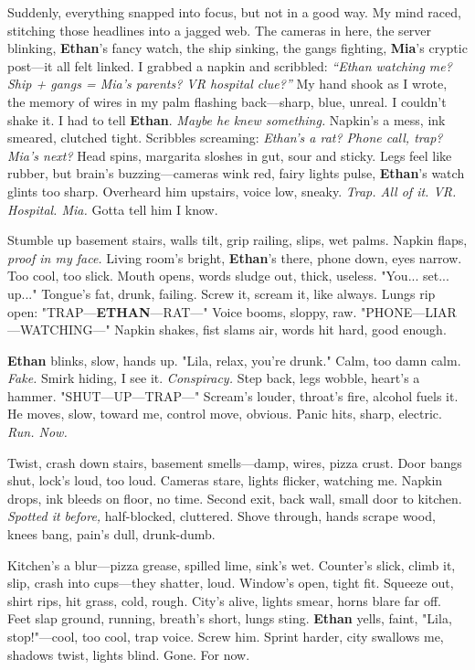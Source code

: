 \documentclass{article}
\begin{document}
Suddenly, everything snapped into focus, but not in a good way. My mind raced, stitching those headlines into a jagged web. The cameras in here, the server blinking, \textbf{Ethan}’s fancy watch, the ship sinking, the gangs fighting, \textbf{Mia}’s cryptic post—it all felt linked. I grabbed a napkin and scribbled: \textit{“Ethan watching me? Ship + gangs = Mia’s parents? VR hospital clue?”} My hand shook as I wrote, the memory of wires in my palm flashing back—sharp, blue, unreal. I couldn’t shake it. I had to tell \textbf{Ethan}. \textit{Maybe he knew something.} Napkin’s a mess, ink smeared, clutched tight. Scribbles screaming: \textit{Ethan’s a rat? Phone call, trap? Mia’s next?} Head spins, margarita sloshes in gut, sour and sticky. Legs feel like rubber, but brain’s buzzing—cameras wink red, fairy lights pulse, \textbf{Ethan}’s watch glints too sharp. Overheard him upstairs, voice low, sneaky. \textit{Trap. All of it. VR. Hospital. Mia.} Gotta tell him I know.

Stumble up basement stairs, walls tilt, grip railing, slips, wet palms. Napkin flaps, \textit{proof in my face.} Living room’s bright, \textbf{Ethan}’s there, phone down, eyes narrow. Too cool, too slick. Mouth opens, words sludge out, thick, useless. "You... set... up..." Tongue’s fat, drunk, failing. Screw it, scream it, like always. Lungs rip open: "TRAP—\textbf{ETHAN}—RAT—" Voice booms, sloppy, raw. "PHONE—LIAR—WATCHING—" Napkin shakes, fist slams air, words hit hard, good enough.

\textbf{Ethan} blinks, slow, hands up. "Lila, relax, you’re drunk." Calm, too damn calm. \textit{Fake.} Smirk hiding, I see it. \textit{Conspiracy.} Step back, legs wobble, heart’s a hammer. "SHUT—UP—TRAP—" Scream’s louder, throat’s fire, alcohol fuels it. He moves, slow, toward me, control move, obvious. Panic hits, sharp, electric. \textit{Run. Now.}

Twist, crash down stairs, basement smells—damp, wires, pizza crust. Door bangs shut, lock’s loud, too loud. Cameras stare, lights flicker, watching me. Napkin drops, ink bleeds on floor, no time. Second exit, back wall, small door to kitchen. \textit{Spotted it before,} half-blocked, cluttered. Shove through, hands scrape wood, knees bang, pain’s dull, drunk-dumb.

Kitchen’s a blur—pizza grease, spilled lime, sink’s wet. Counter’s slick, climb it, slip, crash into cups—they shatter, loud. Window’s open, tight fit. Squeeze out, shirt rips, hit grass, cold, rough. City’s alive, lights smear, horns blare far off. Feet slap ground, running, breath’s short, lungs sting. \textbf{Ethan} yells, faint, "Lila, stop!"—cool, too cool, trap voice. Screw him. Sprint harder, city swallows me, shadows twist, lights blind. Gone. For now.
\end{document}
